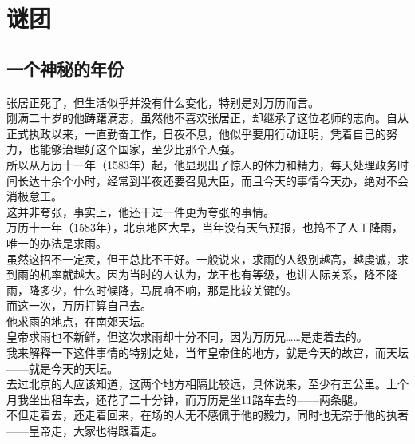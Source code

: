 \section{谜团}
\ifnum{}
	\begin{multicols}{\theparacolNo}
\fi
\subsection{一个神秘的年份}
张居正死了，但生活似乎并没有什么变化，特别是对万历而言。\\

刚满二十岁的他踌躇满志，虽然他不喜欢张居正，却继承了这位老师的志向。自从正式执政以来，一直勤奋工作，日夜不息，他似乎要用行动证明，凭着自己的努力，也能够治理好这个国家，至少比那个人强。\\

所以从万历十一年（1583年）起，他显现出了惊人的体力和精力，每天处理政务时间长达十余个小时，经常到半夜还要召见大臣，而且今天的事情今天办，绝对不会消极怠工。\\

这并非夸张，事实上，他还干过一件更为夸张的事情。\\

万历十一年（1583年），北京地区大旱，当年没有天气预报，也搞不了人工降雨，唯一的办法是求雨。\\

虽然这招不一定灵，但干总比不干好。一般说来，求雨的人级别越高，越虔诚，求到雨的机率就越大。因为当时的人认为，龙王也有等级，也讲人际关系，降不降雨，降多少，什么时候降，马屁响不响，那是比较关键的。\\

而这一次，万历打算自己去。\\

他求雨的地点，在南郊天坛。\\

皇帝求雨也不新鲜，但这次求雨却十分不同，因为万历兄……是走着去的。\\

我来解释一下这件事情的特别之处，当年皇帝住的地方，就是今天的故宫，而天坛——就是今天的天坛。\\

去过北京的人应该知道，这两个地方相隔比较远，具体说来，至少有五公里。上个月我坐出租车去，还花了二十分钟，而万历是坐11路车去的——两条腿。\\

不但走着去，还走着回来，在场的人无不感佩于他的毅力，同时也无奈于他的执著——皇帝走，大家也得跟着走。\\


\end{multicols}
